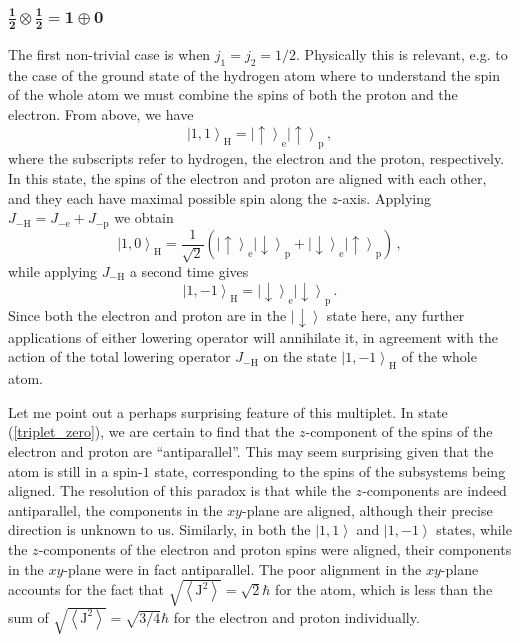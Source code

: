 \documentclass{article}
\theoremstyle{plain}\theoremheaderfont{\normalfont\itshape}\theorembodyfont{\rmfamily}\theoremseparator{.}\newtheorem*{rem}{Remark}\newtheorem*{ex}{Example}\newtheorem*{proof}{Proof}\newtheorem*{altp}{Alternative proof}
\theoremstyle{plain}\theoremheaderfont{\normalfont\bfseries}\theorembodyfont{\rmfamily}\theoremseparator{.}\newtheorem{thm}{Theorem}[section]\newtheorem{lem}[thm]{Lemma}\newtheorem{prop}[thm]{Proposition}\newtheorem*{cor}{Corollary}\newtheorem{defn}[thm]{Definition}\newtheorem{clm}[thm]{Claim}\newtheorem{clminproof}{Claim}
\theoremstyle{break}\theoremheaderfont{\normalfont\itshape}\theorembodyfont{\rmfamily}\theoremseparator{.\medskip}\newtheorem*{proofskip}{Proof}\newtheorem*{exs}{Examples}\newtheorem*{rems}{Remarks}
\theoremstyle{break}\theoremheaderfont{\normalfont\bfseries}\theorembodyfont{\rmfamily}\theoremseparator{.\medskip}\newtheorem{lemskip}[thm]{Lemma}\newtheorem{defnskip}[thm]{Definition}\newtheorem{propskip}[thm]{Proposition}\newtheorem{thmskip}[thm]{Theorem}
\numberwithin{equation}{section}
\newcommand{\ket}[1]{\left| #1 \right\rangle}
\newcommand{\eval}[1]{\left\langle #1 \right\rangle}
\newcommand{\vb}[1]{\bm{\mathrm{#1}}}
\begin{document}
    \subsubsection{\texorpdfstring{\(\bm{\frac{1}{2}\otimes\frac{1}{2}=1\oplus 0}\)}{1/2 * 1/2 = 1 + 0}}
    The first non-trivial case is when \(j_1=j_2=1/2\). Physically this is relevant, e.g. to the case of the ground state of the hydrogen atom where to understand the spin of the whole atom we must combine the spins of both the proton and the electron. From above, we have
    \begin{equation}
        \ket{1,1}_{\mathrm{H}}=\ket{\uparrow}_{\mathrm{e}}\ket{\uparrow}_{\mathrm{p}}\,,
    \end{equation}
    where the subscripts refer to hydrogen, the electron and the proton, respectively. In this state, the spins of the electron and proton are aligned with each other, and they each have maximal possible spin along the \(z\)-axis. Applying \(J_{-\mathrm{H}}=J_{-\mathrm{e}}+J_{-\mathrm{p}}\) we obtain
    \begin{equation}\label{triplet_zero}
        \ket{1,0}_{\mathrm{H}}=\frac{1}{\sqrt{2}}\left(\ket{\uparrow}_{\mathrm{e}}\ket{\downarrow}_{\mathrm{p}}+\ket{\downarrow}_{\mathrm{e}}\ket{\uparrow}_{\mathrm{p}}\right)\,,
    \end{equation}
    while applying \(J_{-\mathrm{H}}\) a second time gives
    \begin{equation}
        \ket{1,-1}_{\mathrm{H}}=\ket{\downarrow}_{\mathrm{e}}\ket{\downarrow}_{\mathrm{p}}\,.
    \end{equation}
    Since both the electron and proton are in the \(\ket{\downarrow}\) state here, any further applications of either lowering operator will annihilate it, in agreement with the action of the total lowering operator \(J_{-\mathrm{H}}\) on the state \(\ket{1,-1}_{\mathrm{H}}\) of the whole atom.

    Let me point out a perhaps surprising feature of this multiplet. In state (\ref{triplet_zero}), we are certain to find that the \(z\)-component of the spins of the electron and proton are ``antiparallel''. This may seem surprising given that the atom is still in a spin-\(1\) state, corresponding to the spins of the subsystems being aligned. The resolution of this paradox is that while the \(z\)-components are indeed antiparallel, the components in the \(xy\)-plane are aligned, although their precise direction is unknown to us. Similarly, in both the \(\ket{1,1}\) and \(\ket{1,-1}\) states, while the \(z\)-components of the electron and proton spins were aligned, their components in the \(xy\)-plane were in fact antiparallel. The poor alignment in the \(xy\)-plane accounts for the fact that \(\sqrt{\eval{\vb{J}^2}}=\sqrt{2}\hbar\) for the atom, which is less than the sum of \(\sqrt{\eval{\vb{J}^2}}=\sqrt{3/4}\hbar\) for the electron and proton individually.
\end{document}
